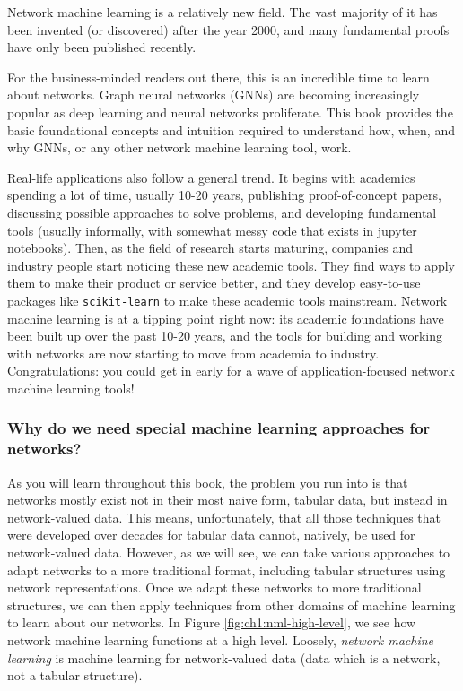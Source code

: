 Network machine learning is a relatively new field. The vast majority of it has been invented (or discovered) after the year 2000, and many fundamental proofs have only been published recently. 

For the business-minded readers out there, this is an incredible time to learn about networks. Graph neural networks (GNNs) are becoming increasingly popular as deep learning and neural networks proliferate. This book provides the basic foundational concepts and intuition required to understand how, when, and why GNNs, or any other network machine learning tool, work.

Real-life applications also follow a general trend. It begins with academics spending a lot of time, usually 10-20 years, publishing proof-of-concept papers, discussing possible approaches to solve problems, and developing fundamental tools (usually informally, with somewhat messy code that exists in jupyter notebooks). Then, as the field of research starts maturing, companies and industry people start noticing these new academic tools. They find ways to apply them to make their product or service better, and they develop easy-to-use packages like \texttt{scikit-learn} to make these academic tools mainstream. Network machine learning is at a tipping point right now: its academic foundations have been built up over the past 10-20 years, and the tools for building and working with networks are now starting to move from academia to industry. Congratulations: you could get in early for a wave of application-focused network machine learning tools!


\subsubsection{Why do we need special machine learning approaches for networks?}

As you will learn throughout this book, the problem you run into is that networks mostly exist not in their most naive form, tabular data, but instead in network-valued data. This means, unfortunately, that all those techniques that were developed over decades for tabular data cannot, natively, be used for network-valued data. However, as we will see, we can take various approaches to {adapt} networks to a more traditional format, including tabular structures using network representations. Once we adapt these networks  to more traditional structures, we can then apply techniques from other domains of machine learning to learn about our networks. In Figure \ref{fig:ch1:nml-high-level}, we see how network machine learning functions at a high level. Loosely, \textit{network machine learning} is machine learning for network-valued data (data which is a {network}, not a {tabular structure}). 

